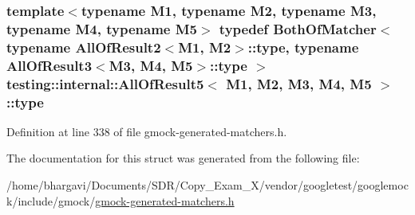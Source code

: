 \subsubsection[{\texorpdfstring{type}{type}}]{\setlength{\rightskip}{0pt plus 5cm}template$<$typename M1, typename M2, typename M3, typename M4, typename M5$>$ typedef {\bf Both\+Of\+Matcher}$<$ typename {\bf All\+Of\+Result2}$<$M1, M2$>$\+::{\bf type}, typename {\bf All\+Of\+Result3}$<$M3, M4, M5$>$\+::{\bf type} $>$ {\bf testing\+::internal\+::\+All\+Of\+Result5}$<$ M1, M2, M3, M4, M5 $>$\+::{\bf type}}\hypertarget{structtesting_1_1internal_1_1_all_of_result5_aee2e1fb803f428741d147347b692d108}{}\label{structtesting_1_1internal_1_1_all_of_result5_aee2e1fb803f428741d147347b692d108}


Definition at line 338 of file gmock-\/generated-\/matchers.\+h.



The documentation for this struct was generated from the following file\+:\begin{DoxyCompactItemize}
\item 
/home/bhargavi/\+Documents/\+S\+D\+R/\+Copy\+\_\+\+Exam\+\_\+X/vendor/googletest/googlemock/include/gmock/\hyperlink{gmock-generated-matchers_8h}{gmock-\/generated-\/matchers.\+h}\end{DoxyCompactItemize}
